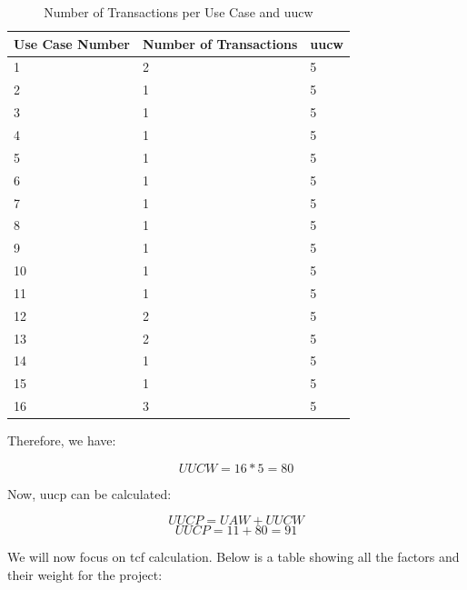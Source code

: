 \documentclass[11pt]{article}
\begin{document}
\begin{table}[ht!]
\centering
\caption{Number of Transactions per Use Case and \gls{uucw}}
\label{my-label}
\begin{tabular}{|l|l|l|}
\hline
Use Case Number & Number of Transactions & \gls{uucw} \\ \hline
1               & 2                      & 5    \\ \hline
2               & 1                      & 5    \\ \hline
3               & 1                      & 5    \\ \hline
4               & 1                      & 5    \\ \hline
5               & 1                      & 5    \\ \hline
6               & 1                      & 5    \\ \hline
7               & 1                      & 5    \\ \hline
8               & 1                      & 5    \\ \hline
9               & 1                      & 5    \\ \hline
10              & 1                      & 5    \\ \hline
11              & 1                      & 5    \\ \hline
12              & 2                      & 5    \\ \hline
13              & 2                      & 5    \\ \hline
14              & 1                      & 5    \\ \hline
15              & 1                      & 5    \\ \hline
16              & 3                      & 5    \\ \hline
\end{tabular}%
\end{table}

Therefore, we have:

$$ UUCW = 16 * 5 = 80 $$

Now, \gls{uucp} can be calculated:

$$ UUCP = UAW + UUCW $$
$$ UUCP = 11 + 80 = 91 $$

\newpage

We will now focus on \gls{tcf} calculation. Below is a table showing all the factors and their weight for the project:
\end{document}
